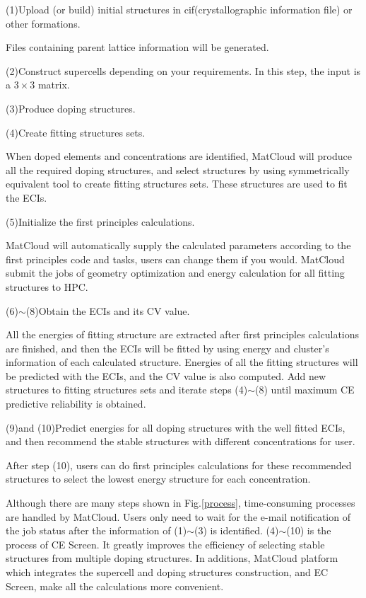 \documentclass[aps,preprint,amsmath,amssymb]{revtex4}
\begin{document}
(1)Upload (or build) initial structures in cif(crystallographic information file) or other formations.

Files containing parent lattice information will be generated.

(2)Construct supercells depending on your requirements. In this step, the input is a $3\times3$ matrix.

(3)Produce doping structures.

(4)Create fitting structures sets.

When doped elements and concentrations are identified, MatCloud will produce all the required doping structures, and
select structures by using symmetrically equivalent tool to create fitting structures sets. These structures are used to
fit the ECIs.

(5)Initialize the first principles calculations.

MatCloud will automatically supply the calculated parameters according to the first principles code and tasks,
users can change them if you would. MatCloud submit the jobs of geometry optimization and energy calculation
for all fitting structures to HPC.

(6)$\sim$(8)Obtain the ECIs and its CV value.

All the energies of fitting structure are extracted after first principles calculations are finished,
and then the ECIs will be fitted by using energy and cluster's information of each calculated structure.
Energies of all the fitting structures will be predicted with the ECIs, and the CV value is also computed.
Add new structures to fitting structures sets and iterate steps (4)$\sim$(8) until maximum CE predictive reliability is obtained.

(9)and (10)Predict energies for all doping structures with the well fitted ECIs, and then recommend the stable structures with different
concentrations for user.

After step (10), users can do first principles calculations for these recommended structures to select the lowest energy structure for
each concentration.

Although there are many steps shown in Fig.\ref{process}, time-consuming processes are handled by MatCloud.
Users only need to wait for the e-mail notification of the job status after the information of (1)$\sim$(3) is identified.
(4)$\sim$(10) is the process of CE Screen. It greatly improves the efficiency of selecting stable structures from multiple doping structures.
In additions, MatCloud platform which integrates the supercell and doping structures construction, and EC Screen,
make all the calculations more convenient.
\end{document}
